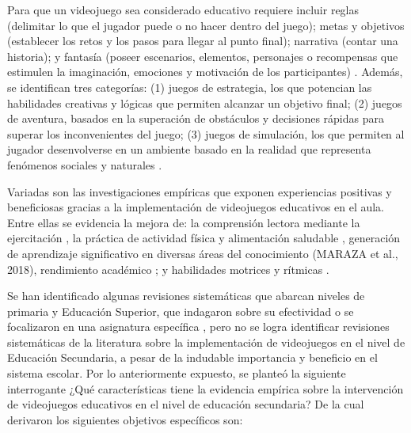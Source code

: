 \documentclass[spanish]{textolivre}
\begin{document}
Para que un videojuego sea considerado educativo requiere incluir reglas (delimitar lo que el jugador puede o no hacer dentro del juego); metas y objetivos (establecer los retos y los pasos para llegar al punto final); narrativa (contar una historia); y fantasía (poseer escenarios, elementos, personajes o recompensas que estimulen la imaginación, emociones y motivación de los participantes) \cite{pineda_videojuego_2019}. Además, se identifican tres categorías: (1) juegos de estrategia, los que potencian las habilidades creativas y lógicas que permiten alcanzar un objetivo final; (2) juegos de aventura, basados en la superación de obstáculos y decisiones rápidas para superar los inconvenientes del juego; (3) juegos de simulación, los que permiten al jugador desenvolverse en un ambiente basado en la realidad que representa fenómenos sociales y naturales \cite{maraza_quispe_efectos_2018}. 

Variadas son las investigaciones empíricas que exponen experiencias positivas y beneficiosas gracias a la implementación de videojuegos educativos en el aula. Entre ellas se evidencia la mejora de: la comprensión lectora mediante la ejercitación \cite{castro_maximum_2015}, la práctica de actividad física y alimentación saludable \cite{gonzalez_gonzalez_programa_2016,urquidez_romero_physical_2017}, generación de aprendizaje significativo en diversas áreas del conocimiento (MARAZA et al., 2018), rendimiento académico \cite{macias_ruiz_videojuegos_2020}; y habilidades motrices y rítmicas \cite{abarca_rendimiento_2020}. 

Se han identificado algunas revisiones sistemáticas que abarcan niveles de primaria y Educación Superior, que indagaron sobre su efectividad o se focalizaron en una asignatura específica \cite{araujo_exergames_2017, torres-toukoumidis_desarrollo_2016,diaz_history_2018,sousa_videogames_2018}, pero no se logra identificar revisiones sistemáticas de la literatura sobre la implementación de videojuegos en el nivel de Educación Secundaria, a pesar de la indudable importancia y beneficio en el sistema escolar. Por lo anteriormente expuesto, se planteó la siguiente interrogante ¿Qué características tiene la evidencia empírica sobre la intervención de videojuegos educativos en el nivel de educación secundaria? De la cual derivaron los siguientes objetivos específicos son: 
\end{document}

